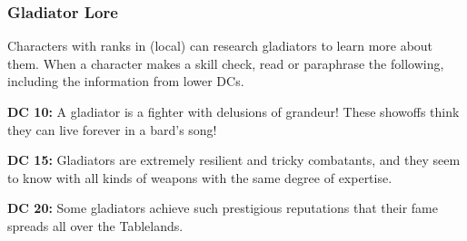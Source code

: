 \subsubsection{Gladiator Lore}

Characters with ranks in  (local) can research gladiators to learn more about them. When a character makes a skill check, read or paraphrase the following, including the information from lower DCs.

\textbf{DC 10:} A gladiator is a fighter with delusions of grandeur! These showoffs think they can live forever in a bard's song!

\textbf{DC 15:} Gladiators are extremely resilient and tricky combatants, and they seem to know with all kinds of weapons with the same degree of expertise.

\textbf{DC 20:} Some gladiators achieve such prestigious reputations that their fame spreads all over the Tablelands.
